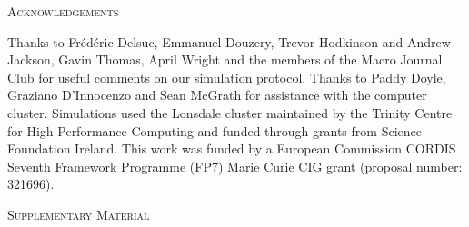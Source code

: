\documentclass[12pt,letterpaper]{article}
\renewcommand{\section}[1]{%
\bigskip
\begin{center}
\begin{Large}
\normalfont\scshape #1
\medskip
\end{Large}
\end{center}}
\begin{document}
%
%


\section{Acknowledgements}
Thanks to Fr\'{e}d\'{e}ric Delsuc, Emmanuel Douzery, Trevor Hodkinson and Andrew Jackson, Gavin Thomas, April Wright and the members of the Macro Journal Club %
for useful comments on our simulation protocol. Thanks to Paddy Doyle, Graziano D'Innocenzo and Sean McGrath for assistance with the computer cluster. Simulations used the Lonsdale cluster maintained by the Trinity Centre for High Performance Computing and funded through grants from Science Foundation Ireland. This work was funded by a European Commission CORDIS Seventh Framework Programme (FP7) Marie Curie CIG grant (proposal number: 321696).




\section{Supplementary Material}

    
    \label{SupplementaryMaterial}

\end{document}

